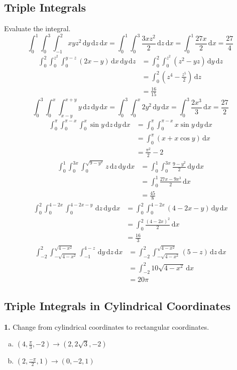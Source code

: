 \documentclass[a4paper,12pt]{article}
\newcommand{\ud}{\,\mathrm{d}}
\newcommand{\exercise}[1]{\noindent\textbf{#1.}}
\begin{document}
\subsection{Triple Integrals}
Evaluate the integral.
\[\int_0^1\int_0^3\int_{-1}^2 xyz^2\ud y\ud z\ud x
= \int_0^1\int_0^3\frac{3xz^2}{2}\ud z\ud x
= \int_0^1\frac{27x}{2}\ud x
= \frac{27}{4}\tag{1}\]
\begin{align*}
  \int_0^2\int_0^{z^2}\int_0^{y-z}(2x - y)\ud x\ud y\ud z
  &= \int_0^2\int_0^{z^2}(z^2 - yz)\ud y\ud z\\
  &= \int_0^2\left(z^4 - \frac{z^5}{2}\right)\ud z\\
  &= \frac{16}{15}\tag{3}
\end{align*}
\[\int_0^3\int_0^x\int_{x-y}^{x+y}y\ud z\ud y\ud x
= \int_0^3\int_0^x 2y^2\ud y\ud x
= \int_0^3\frac{2x^3}{3}\ud x
= \frac{27}{2}\tag{9}\]
\begin{align*}
  \int_0^\pi\int_0^{\pi-x}\int_0^x\sin y\ud z\ud y\ud x
  &= \int_0^\pi\int_0^{\pi-x}x\sin y\ud y\ud x\\
  &= \int_0^\pi(x + x\cos y)\ud x\\
  &= \frac{\pi^2}{2} - 2\tag{12}
\end{align*}
\begin{align*}
  \int_0^1\int_0^{3x}\int_0^{\sqrt{9-y^2}}z\ud z\ud y\ud x
  &= \int_0^1\int_0^{3x}\frac{9 - y^2}{2}\ud y\ud x\\
  &= \int_0^1\frac{27x - 9x^3}{2}\ud x\\
  &= \frac{45}{8}\tag{18}
\end{align*}
\begin{align*}
  \int_0^2\int_0^{4-2x}\int_0^{4-2x-y}\ud z\ud y\ud x
  &= \int_0^2\int_0^{4-2x}(4 - 2x - y)\ud y\ud x\\
  &= \int_0^2\frac{(4 - 2x)^2}{2}\ud x\\
  &= \frac{16}{3}\tag{19}
\end{align*}
\begin{align*}
  \int_{-2}^2\int_{-\sqrt{4-x^2}}^{\sqrt{4-x^2}}\int_{-1}^{4-z}\ud y\ud z\ud x
  &= \int_{-2}^2\int_{-\sqrt{4-x^2}}^{\sqrt{4-x^2}}(5 - z)\ud z\ud x\\
  &= \int_{-2}^2 10\sqrt{4 - x^2}\ud x\\
  &= 20\pi\tag{22}
\end{align*}

\subsection{Triple Integrals in Cylindrical Coordinates}
\exercise{1} Change from cylindrical coordinates to rectangular coordinates.
\begin{enumerate}[(a)]
  \item $\left(4, \frac{\pi}{3}, -2\right)
    \rightarrow \left(2, 2\sqrt 3, -2\right)$
  \item $\left(2, \frac{-\pi}{2}, 1\right) \rightarrow \left(0, -2, 1\right)$
\end{enumerate}
\end{document}

